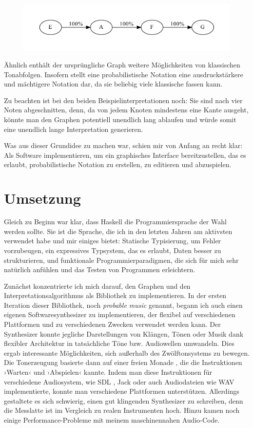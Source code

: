 \documentclass[a4paper,twocolumn]{article}
\begin{document}
\begin{figure}[h]
\includegraphics[width=.5\textwidth]{example-graph-interpretation2}
\end{figure}

Ähnlich enthält der ursprüngliche Graph weitere Möglichkeiten von klassischen
Tonabfolgen. Insofern stellt eine probabilistische Notation eine
ausdruckstärkere und mächtigere Notation dar, da sie beliebig viele klassische
fassen kann.

Zu beachten ist bei den beiden
Beispielinterpretationen noch: Sie sind nach vier Noten abgeschnitten, denn, da
von jedem Knoten mindestens eine Kante ausgeht, könnte man den Graphen
potentiell unendlich lang ablaufen und würde somit eine unendlich lange
Interpretation generieren.

Was aus dieser Grundidee zu machen war, schien mir von Anfang an recht klar: Als
Software implementieren, um ein graphisches Interface bereitzustellen, das es
erlaubt, probabilistische Notation zu erstellen, zu editieren und abzuspielen.

\section*{Umsetzung}

Gleich zu Beginn war klar, dass Haskell die Programmiersprache der Wahl werden
sollte. Sie ist die Sprache, die ich in den letzten Jahren am aktivsten
verwendet habe und mir einiges bietet: Statische Typisierung, um Fehler
vorzubeugen, ein expressives Typsystem, das es erlaubt, Daten besser zu
strukturieren, und funktionale Programmierparadigmen, die sich für mich sehr
natürlich anfühlen und das Testen von Programmen erleichtern.

Zunächst konzentrierte ich mich darauf, den Graphen und den
Interpretationsalgorithmus als Bibliothek zu implementieren. In der ersten
Iteration dieser Bibliothek, noch {\it probable music} genannt, begann ich auch
einen eigenen Softwaresynthesizer zu implementieren, der flexibel auf
verschiedenen Plattformen und zu verschiedenen Zwecken verwendet werden kann.
Der Synthesizer konnte jegliche Darstellungen von Klängen, Tönen oder Musik dank
flexibler Architektur in tatsächliche Töne bzw. Audiowellen umwandeln. Dies
ergab interessante Möglichkeiten, sich außerhalb des
Zwölftonsystems zu bewegen. Die Tonerzeugung basierte dann auf einer freien
Monade \cite{free_monad}, die die Instruktionen ›Warten‹ und ›Abspielen‹ kannte.
Indem man diese Instruktionen für verschiedene Audiosystem, wie SDL \cite{sdl},
Jack \cite{jack} oder auch Audiodateien wie WAV \cite{wav} implementierte,
konnte man verschiedene Plattformen unterstützen. Allerdings gestaltete es sich
schwierig, einen gut klingenden Synthesizer zu schreiben, denn die
Messlatte ist im Vergleich zu realen Instrumenten hoch. Hinzu kamen noch einige
Performance-Probleme mit meinem maschinennahen Audio-Code.
\end{document}
